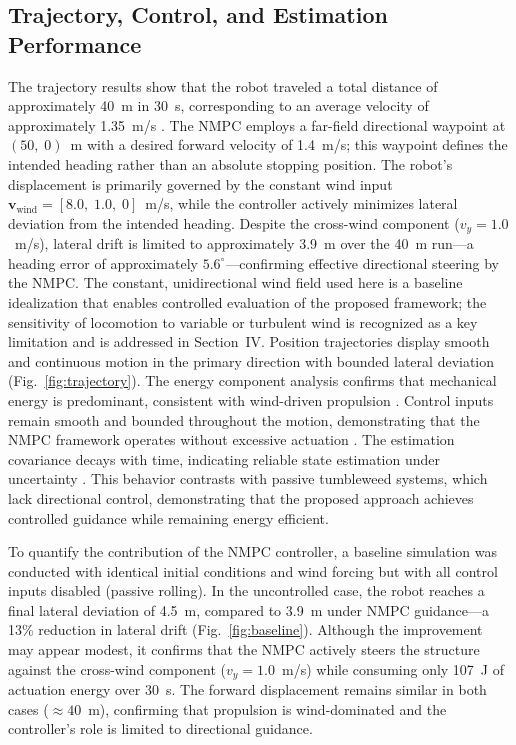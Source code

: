\documentclass[conference]{IEEEtran}
\begin{document}
\subsection{Trajectory, Control, and Estimation Performance}
The trajectory results show that the robot traveled a total distance of
approximately 40~m in 30~s, corresponding to an average velocity of
approximately 1.35~m/s \cite{b21}. The NMPC employs a far-field directional
waypoint at $(50,\;0)$~m with a desired forward velocity of 1.4~m/s;
this waypoint defines the intended heading rather than an absolute stopping
position. The robot's displacement is primarily governed by the constant wind
input $\mathbf{v}_{\mathrm{wind}} = [8.0,\;1.0,\;0]$~m/s, while the
controller actively minimizes lateral deviation from the intended heading.
Despite the cross-wind component ($v_y = 1.0$~m/s), lateral drift is limited
to approximately 3.9~m over the 40~m run---a heading error of
approximately $5.6^\circ$---confirming effective directional steering by the
NMPC. The constant, unidirectional wind field used here is a baseline
idealization that enables controlled evaluation of the proposed framework;
the sensitivity of locomotion to variable or turbulent wind is recognized as
a key limitation and is addressed in Section~IV.
Position trajectories display smooth and continuous motion in the primary
direction with bounded lateral deviation (Fig.~\ref{fig:trajectory}). The
energy component analysis confirms that mechanical energy is predominant,
consistent with wind-driven propulsion \cite{b11,b19}. Control inputs remain
smooth and bounded throughout the motion, demonstrating that the NMPC
framework operates without excessive actuation \cite{b6,b10}. The estimation
covariance decays with time, indicating reliable state estimation under
uncertainty \cite{b7,b20}. This behavior contrasts with passive tumbleweed
systems, which lack directional control, demonstrating that the proposed
approach achieves controlled guidance while remaining energy efficient.

To quantify the contribution of the NMPC controller, a baseline simulation
was conducted with identical initial conditions and wind forcing but with all
control inputs disabled (passive rolling). In the uncontrolled case, the
robot reaches a final lateral deviation of 4.5~m, compared to 3.9~m under
NMPC guidance---a 13\% reduction in lateral drift
(Fig.~\ref{fig:baseline}). Although the improvement may appear modest, it
confirms that the NMPC actively steers the structure against the cross-wind
component ($v_y = 1.0$~m/s) while consuming only 107~J of actuation energy
over 30~s. The forward displacement remains similar in both cases
($\approx 40$~m), confirming that propulsion is wind-dominated and the
controller's role is limited to directional guidance.
\end{document}
